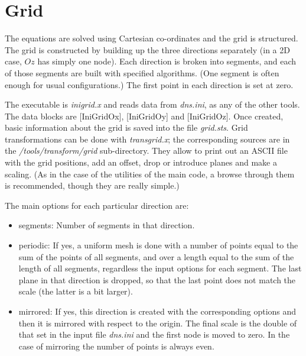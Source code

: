 \chapter{Grid}

The equations are solved using Cartesian co-ordinates and the grid is
structured. The grid is constructed by building up the three directions
separately (in a 2D case, $Oz$ has simply one node).  Each direction is broken
into segments, and each of those segments are built with specified
algorithms. (One segment is often enough for usual configurations.) The first
point in each direction is set at zero.

The executable is \emph{inigrid.x} and reads data from {\it dns.ini}, as any of
the other tools. The data blocks are [IniGridOx], [IniGridOy] and
[IniGridOz]. Once created, basic information about the grid is saved into the
file {\it grid.sts}. Grid transformations can be done with \emph{transgrid.x};
the corresponding sources are in the \emph{/tools/transform/grid}
sub-directory. They allow to print out an ASCII file with the grid positions,
add an offset, drop or introduce planes and make a scaling.  (As in the case of
the utilities of the main code, a browse through them is recommended, though
they are really simple.)

\bigskip

The main options for each particular direction are:
\begin{itemize}
\item segments: Number of segments in that direction.
\item periodic: If yes, a uniform mesh is done with a number of points equal to
  the sum of the points of all segments, and over a length equal to the sum of
  the length of all segments, regardless the input options for each segment. The
  last plane in that direction is dropped, so that the last point does not match
  the scale (the latter is a bit larger).
\item mirrored: If yes, this direction is created with the corresponding options
  and then it is mirrored with respect to the origin. The final scale is the
  double of that set in the input file \emph{dns.ini} and the first node is
  moved to zero. In the case of mirroring the number of points is always even. 
\end{itemize}


